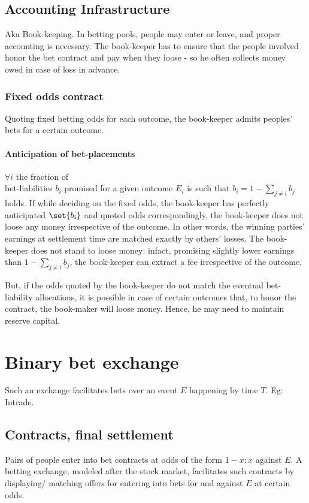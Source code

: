 \documentclass[oneside, article]{memoir}
\begin{document}
\subsection{Accounting Infrastructure}
Aka Book-keeping. In betting pools, people may enter or leave, and proper accounting is necessary. The book-keeper has to ensure that the people involved honor the bet contract and pay when they loose - so he often collects money owed in case of loss in advance.

\subsubsection{Fixed odds contract}
Quoting fixed betting odds for each outcome, the book-keeper admits peoples' bets for a certain outcome.

\paragraph{Anticipation of bet-placements}
$\forall i$ the fraction of \\bet-liabilities $b_i$ promised for a given outcome $E_i$ is such that $b_i = 1 - \sum_{j\neq i}b_j$ holds. If while deciding on the fixed odds, the book-keeper has perfectly anticipated $\set{b_i}$ and quoted odds correspondingly, the book-keeper does not loose any money irrespective of the outcome. In other words, the winning parties' earnings at settlement time are matched exactly by others' losses. The book-keeper does not stand to loose money: infact, promising slightly lower earnings than $1 - \sum_{j\neq i}b_j$, the book-keeper can extract a fee irrespective of the outcome.

But, if the odds quoted by the book-keeper do not match the eventual bet-liability allocations, it is possible in case of certain outcomes that, to honor the contract, the book-maker will loose money. Hence, he may need to maintain reserve capital.

\section{Binary bet exchange}
Such an exchange facilitates bets over an event $E$ happening by time $T$. Eg: Intrade.

\subsection{Contracts, final settlement}
Pairs of people enter into bet contracts at odds of the form $1-x: x$ against $E$. A betting exchange, modeled after the stock market, facilitates such contracts by displaying/ matching offers for entering into bets for and against $E$ at certain odds.
\end{document}
